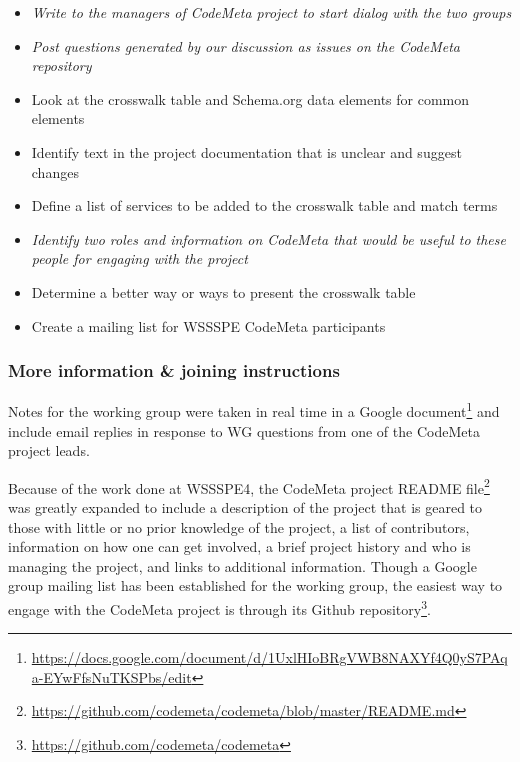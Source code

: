 \begin{itemize}
\item {\em Write to the managers of CodeMeta project to start dialog with the two groups}
\item {\em Post questions generated by our discussion as issues on the CodeMeta repository}
\item Look at the crosswalk table and Schema.org data elements for common elements
\item Identify text in the project documentation that is unclear and suggest changes
\item Define a list of services to be added to the crosswalk table and match terms
\item {\em Identify two roles and information on CodeMeta that would be useful to these people for engaging with the project}
\item Determine a better way or ways to present the crosswalk table
\item Create a mailing list for WSSSPE CodeMeta participants
\end{itemize}


\subsubsection{More information \& joining instructions}

Notes for the working group were taken in real time in a Google document\footnote{\url{https://docs.google.com/document/d/1UxlHIoBRgVWB8NAXYf4Q0yS7PAqa-EYwFfsNuTKSPbs/edit}} and include email replies in response to WG questions from one of the CodeMeta project leads.

Because of the work done at WSSSPE4, the CodeMeta project README file\footnote{\url{https://github.com/codemeta/codemeta/blob/master/README.md}} was greatly expanded to include a description of the project that is geared to those with little or no prior knowledge of the project, a list of contributors, information on how one can get involved, a brief project history and who is managing the project, and links to additional information. Though a Google group mailing list has been established for the working group, the easiest way to engage with the CodeMeta project is through its Github repository\footnote{\url{https://github.com/codemeta/codemeta}}.
